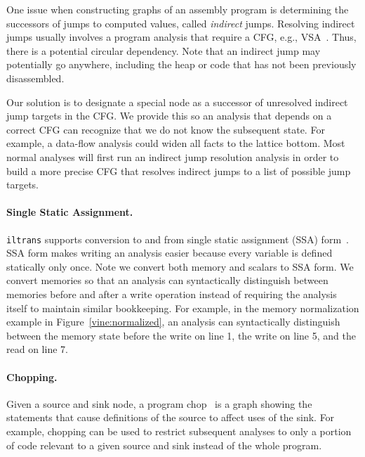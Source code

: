 One issue when constructing  graphs of an assembly program is
determining the successors of jumps to computed values, called {\it
  indirect} jumps.  Resolving indirect jumps usually involves a program
analysis that require a CFG, e.g., VSA~\cite{balakrishnan:2007}. Thus,
there is a potential circular dependency.  Note that an indirect jump
may potentially go anywhere, including the heap or code that has not
been previously disassembled.

Our solution is to designate a special node as a successor of
unresolved indirect jump targets in the CFG.  We provide this so an
analysis that depends on a correct CFG can recognize that we do not
know the subsequent state. For example, a data-flow analysis could
widen all facts to the lattice bottom.  Most normal analyses will
first run an indirect jump resolution analysis in order to build a
more precise CFG that resolves indirect jumps to a list of possible
jump targets.  %

\paragraph{Single Static Assignment.} {\tt iltrans} supports
conversion to and from single static assignment (SSA)
form~\cite{muchnick:1997}. SSA form makes writing an analysis easier
because every variable is defined statically only once.  Note we
convert both memory and scalars to SSA form. We convert memories so
that an analysis can syntactically distinguish between memories before
and after a write operation instead of requiring the analysis itself
to maintain similar bookkeeping. For example, in the memory
normalization example in Figure~\ref{vine:normalized}, an analysis can
syntactically distinguish between the memory state before the write on
line 1, the write on line 5, and the read on line 7.

\paragraph{Chopping.}  Given a source and sink node, a program
chop~\cite{jackson:1994} is a graph showing the statements that cause
definitions of the source to affect uses of the sink.  For example,
chopping can be used to restrict subsequent analyses to only a portion
of code relevant to a given source and sink instead of the whole
program. %


